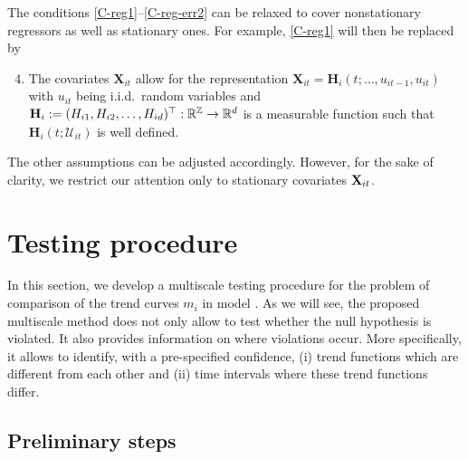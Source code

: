 \documentclass[a4paper,12pt]{article}
\makeatletter
\renewcommand{\eqref}[1]{\tagform@{\ref{#1}}}
\makeatother
\begin{document}
\begin{remark}
The conditions \ref{C-reg1}--\ref{C-reg-err2} can be relaxed to cover nonstationary regressors as well as stationary ones. For example, \ref{C-reg1} will then be replaced by
\begin{enumerate}[label=(C\arabic*$^\ast$),leftmargin=1.05cm]
\setcounter{enumi}{3}
\item \label{C-reg1-star} The covariates $ \mathbf{X}_{it}$ allow for the representation $ \mathbf{X}_{it} = \mathbf{H}_i(t; \ldots,u_{it-1},u_{it})$ with $u_{it}$ being i.i.d.\ random variables and $\mathbf{H}_i := (H_{i1}, H_{i2}, \ldots, H_{id})^\top: \mathbb{R}^{\mathbb{Z}} \rightarrow \mathbb{R}^d$ is a measurable function such that $\mathbf{H}_i(t;\mathcal{U}_{it})$ is well defined. 
\end{enumerate} 
The other assumptions can be adjusted accordingly. However, for the sake of clarity, we restrict our attention only to stationary  covariates $\mathbf{X}_{it}$. 
\end{remark}


\section{Testing procedure}\label{sec:test}

In this section, we develop a multiscale testing procedure for the problem of comparison of the trend curves $m_i$ in model \eqref{eq:model_full}.  As we will see, the proposed multiscale method does not only allow to test whether the null hypothesis is violated. It also provides information on where violations occur. More specifically, it allows to identify, with a pre-specified confidence, (i) trend functions which are different from each other and (ii) time intervals where these trend functions differ.

\subsection{Preliminary steps}\label{subsec:test:prep}
\end{document}
